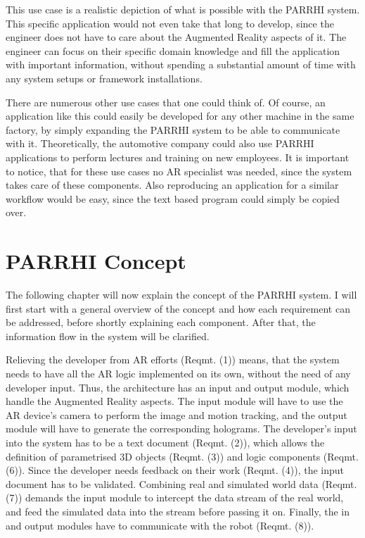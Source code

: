 This use case is a realistic depiction of what is possible with the PARRHI system. This specific application would not even take that long to develop, since the engineer does not have to care about the Augmented Reality aspects of it. The engineer can focus on their specific domain knowledge and fill the application with important information, without spending a substantial amount of time with any system setups or framework installations.

There are numerous other use cases that one could think of. Of course, an application like this could easily be developed for any other machine in the same factory, by simply expanding the PARRHI system to be able to communicate with it. Theoretically, the automotive company could also use PARRHI applications to perform lectures and training on new employees. It is important to notice, that for these use cases no AR specialist was needed, since the system takes care of these components. Also reproducing an application for a similar workflow would be easy, since the text based program could simply be copied over.

\section{PARRHI Concept}

The following chapter will now explain the concept of the PARRHI system. I will first start with a general overview of the concept and how each requirement can be addressed, before shortly explaining each component. After that, the information flow in the system will be clarified.

Relieving the developer from AR efforts (Reqmt. (1)) means, that the system needs to have all the AR logic implemented on its own, without the need of any developer input. Thus, the architecture has an input and output module, which handle the Augmented Reality aspects. The input module will have to use the AR device's camera to perform the image and motion tracking, and the output module will have to generate the corresponding holograms. The developer's input into the system has to be a text document (Reqmt. (2)), which allows the definition of parametrised 3D objects (Reqmt. (3)) and logic components (Reqmt. (6)). Since the developer needs feedback on their work (Reqmt. (4)), the input document has to be validated. Combining real and simulated world data (Reqmt. (7)) demands the input module to intercept the data stream of the real world, and feed the simulated data into the stream before passing it on. Finally, the in and output modules have to communicate with the robot (Reqmt. (8)).

